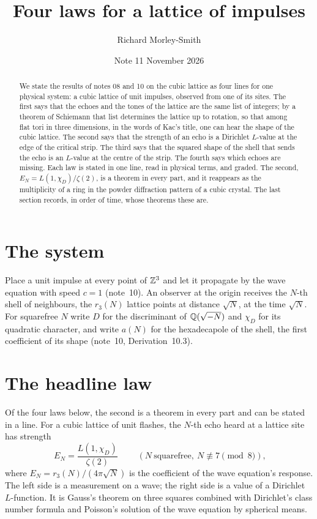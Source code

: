 \documentclass[11pt]{article}
\title{Four laws for a lattice of impulses}
\author{Richard Morley-Smith}
\date{Note 11 \quad November 2026}
\begin{document}
\maketitle

\begin{abstract}
\noindent
We state the results of notes 08 and 10 on the cubic lattice as four lines for one physical system: a cubic lattice of unit impulses, observed from one of its sites.
The first says that the echoes and the tones of the lattice are the same list of integers; by a theorem of Schiemann that list determines the lattice up to rotation, so that among flat tori in three dimensions, in the words of Kac's title, one can hear the shape of the cubic lattice.
The second says that the strength of an echo is a Dirichlet $L$-value at the edge of the critical strip.
The third says that the squared shape of the shell that sends the echo is an $L$-value at the centre of the strip.
The fourth says which echoes are missing.
Each law is stated in one line, read in physical terms, and graded.
The second, $E_N = L(1,\chi_D)/\zeta(2)$, is a theorem in every part, and it reappears as the multiplicity of a ring in the powder diffraction pattern of a cubic crystal.
The last section records, in order of time, whose theorems these are.
\end{abstract}

\section{The system}

Place a unit impulse at every point of $\mathbb{Z}^3$ and let it propagate by the wave equation with speed $c = 1$ (note~10).
An observer at the origin receives the $N$-th shell of neighbours, the $r_3(N)$ lattice points at distance $\sqrt N$, at the time $\sqrt N$.
For squarefree $N$ write $D$ for the discriminant of $\mathbb{Q}(\sqrt{-N})$ and $\chi_D$ for its quadratic character, and write $a(N)$ for the hexadecapole of the shell, the first coefficient of its shape (note~10, Derivation~10.3).

\section{The headline law}

Of the four laws below, the second is a theorem in every part and can be stated in a line.
For a cubic lattice of unit flashes, the $N$-th echo heard at a lattice site has strength
\[
  \boxed{\;E_N = \frac{L(1,\chi_D)}{\zeta(2)}\;}\qquad(N\ \text{squarefree},\ N\not\equiv7\pmod 8),
\]
where $E_N = r_3(N)/(4\pi\sqrt N)$ is the coefficient of the wave equation's response.
The left side is a measurement on a wave; the right side is a value of a Dirichlet $L$-function.
It is Gauss's theorem on three squares combined with Dirichlet's class number formula and Poisson's solution of the wave equation by spherical means.
\end{document}
